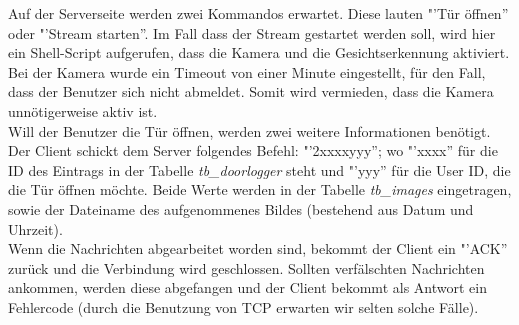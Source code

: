 Auf der Serverseite werden zwei Kommandos erwartet. Diese lauten "'Tür öffnen'' oder "'Stream starten''. Im Fall dass der Stream gestartet werden soll, wird hier ein Shell-Script aufgerufen, dass die Kamera und die Gesichtserkennung aktiviert. Bei der Kamera wurde ein Timeout von einer Minute eingestellt, für den Fall, dass der Benutzer sich nicht abmeldet. Somit wird vermieden, dass die Kamera unnötigerweise aktiv ist.\\

Will der Benutzer die Tür öffnen, werden zwei weitere Informationen benötigt. Der Client schickt dem Server folgendes Befehl: "'2xxxxyyy''; wo "'xxxx'' für die ID des Eintrags in der Tabelle \textit{tb\_doorlogger} steht und "'yyy'' für die User ID, die die Tür öffnen möchte. Beide Werte werden in der Tabelle \textit{tb\_images} eingetragen, sowie der Dateiname des aufgenommenes Bildes (bestehend aus Datum und Uhrzeit).\\

Wenn die Nachrichten abgearbeitet worden sind, bekommt der Client ein "'ACK'' zurück und die Verbindung wird geschlossen. Sollten verfälschten Nachrichten ankommen, werden diese abgefangen und der Client bekommt als Antwort ein Fehlercode (durch die Benutzung von TCP erwarten wir selten solche Fälle).